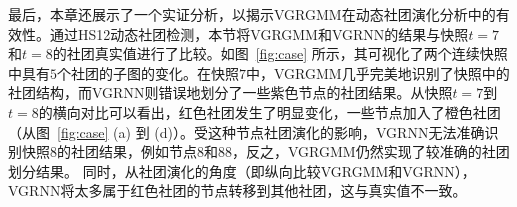 最后，本章还展示了一个实证分析，以揭示VGRGMM在动态社团演化分析中的有效性。通过HS12动态社团检测，本节将VGRGMM和VGRNN的结果与快照$t=7$和$t=8$的社团真实值进行了比较。如图~\ref{fig:case} 所示，其可视化了两个连续快照中具有$5$个社团的子图的变化。在快照$7$中，VGRGMM几乎完美地识别了快照中的社团结构，而VGRNN则错误地划分了一些紫色节点的社团结果。从快照$t=7$到$t=8$的横向对比可以看出，红色社团发生了明显变化，一些节点加入了橙色社团（从图~\ref{fig:case} (a) 到 (d)）。受这种节点社团演化的影响，VGRNN无法准确识别快照$8$的社团结果，例如节点$8$和$88$，反之，VGRGMM仍然实现了较准确的社团划分结果。
同时，从社团演化的角度（即纵向比较VGRGMM和VGRNN），VGRNN将太多属于红色社团的节点转移到其他社团，这与真实值不一致。


\begin{figure}[htbp]
    \centering
\end{figure}
